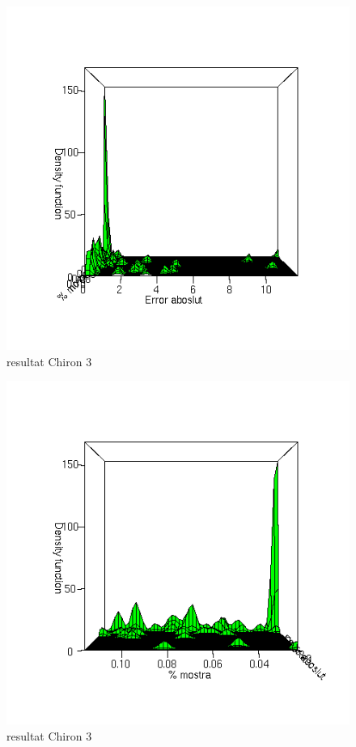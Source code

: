\documentclass[titlepage,a4paper,12pt]{book}
\begin{document}
	\begin{figure}[tbp]
		\begin{center}
			\includegraphics[scale=0.75]{chiron/rgrau3.png}
		\end{center}
		\caption{resultat Chiron 3}
		\label{fig:resChir3}
	\end{figure}
	\begin{figure}[tbp]
		\begin{center}
			\includegraphics[scale=0.75]{chiron/rgrau4.png}
		\end{center}
		\caption{resultat Chiron 3}
		\label{fig:resChir4}
	\end{figure}
\end{document}
